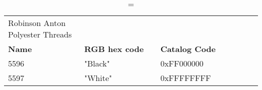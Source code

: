 
\begin{longtable}{p{0.3\linewidth} p{0.3\linewidth} p{0.4\linewidth}}
\caption = {Robinson Anton Polyester Threads}
\label{tblr:robinsonpoly}\\
\textbf{Name} & \textbf{RGB hex code} & \textbf{Catalog Code} \\
5596 &  "Black" &  0xFF000000\\
5597 &  "White" &  0xFFFFFFFF\\

\end{longtable}
